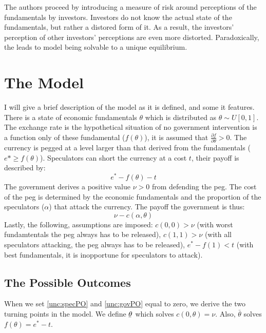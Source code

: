 \begin{refsection}
The authors proceed by introducing a measure of risk around perceptions of the fundamentals by investors.
Investors do not know the actual state of the fundamentals, but rather a distored form of it.
As a result, the investors' perception of other investors' perceptions are even more distorted.
Paradoxically, the leads to model being solvable to a unique equilibrium.

\section{The Model}
\label{unc:model}
I will give a brief description of the model as it is defined, and some it features.
There is a state of economic fundamentals $\theta$ which is distributed as $\theta \sim U[0,1]$.
The exchange rate is the hypothetical situation of no government intervention is a function only of these fundamental ($f(\theta)$),
it is assumed that $\frac{\partial f}{\partial \theta} > 0$.
The currency is pegged at a level larger than that derived from the fundamentals ($e* \geq f(\theta)$).
Speculators can short the currency at a cost $t$, their payoff is described by:
\begin{equation}\label{unc:specPO}
e^* - f(\theta) - t
\end{equation}
The government derives a positive value $\nu > 0$ from defending the peg.
The cost of the peg is determined by the economic fundamentals and the proportion of the speculators ($\alpha$) that attack the currency.
The payoff the government is thus:
\begin{equation}\label{unc:govPO}
\nu - c(\alpha, \theta)
\end{equation}
Lastly, the following, assumptions are imposed: $c(0,0) > \nu$ (with worst fundamtentals the peg always has to be released),
$c(1,1) > \nu$ (with all speculators attacking, the peg always has to be released),
$e^* - f(1) < t$ (with best fundamentals, it is inopportune for speculators to attack).

\subsection{The Possible Outcomes}
When we set \autoref{unc:specPO} and \autoref{unc:govPO} equal to zero,
we derive the two turning points in the model.
We define $\underaccent{\bar}{\theta}$ which solves $c(0, \theta) = \nu$.
Also, $\bar{\theta}$ solves $f(\theta) = e^* - t$.


\end{refsection}
